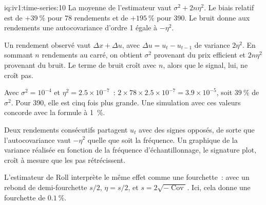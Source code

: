 \begin{solution}{iq:iv1:time-series:10}
La moyenne de l'estimateur vaut $\sigma^2 + 2n\eta^2$. Le biais relatif est de $+39~\%$ pour 78 rendements et de $+195~\%$ pour 390. Le bruit donne aux rendements une autocovariance d'ordre 1 égale à $-\eta^2$.

Un rendement observé vaut $\Delta x + \Delta u$, avec $\Delta u = u_t - u_{t - 1}$ de variance $2\eta^2$. En sommant $n$ rendements au carré, on obtient $\sigma^2$ provenant du prix efficient et $2n\eta^2$ provenant du bruit. Le terme de bruit croît avec $n$, alors que le signal, lui, ne croît pas.

Avec $\sigma^2 = 10^{-4}$ et $\eta^2 = 2.5 \times 10^{-7}$~: $2 \times 78 \times 2.5 \times 10^{-7} = 3.9 \times 10^{-5}$, soit $39~\%$ de $\sigma^2$. Pour 390, elle est cinq fois plus grande. Une simulation avec ces valeurs concorde avec la formule à 1~\%.

Deux rendements consécutifs partagent $u_t$ avec des signes opposés, de sorte que l'autocovariance vaut $-\eta^2$ quelle que soit la fréquence. Un graphique de la variance réalisée en fonction de la fréquence d'échantillonnage, le signature plot, croît à mesure que les pas rétrécissent.

L'estimateur de Roll interprète le même effet comme une fourchette~: avec un rebond de demi-fourchette $s/2$, $\eta = s/2$, et $s = 2\sqrt{-\operatorname{Cov}}$. Ici, cela donne une fourchette de $0.1~\%$.



\end{solution}

